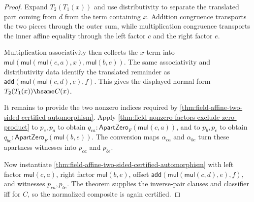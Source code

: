 \begin{proof}
Expand $T_2(T_1(x))$ and use distributivity to separate the translated part
coming from $d$ from the term containing $x$. Addition congruence transports
the two pieces through the outer sum, while multiplication congruence transports
the inner affine equality through the left factor $c$ and the right factor
$e$.

Multiplication associativity then collects the $x$-term into
$\mathsf{mul}(\mathsf{mul}(\mathsf{mul}(c,a),x),\mathsf{mul}(b,e))$. The same
associativity and distributivity data identify the translated remainder as
$\mathsf{add}(\mathsf{mul}(\mathsf{mul}(c,d),e),f)$. This gives the displayed
normal form $T_2(T_1(x))\hsame C(x)$.

It remains to provide the two nonzero indices required by
\autoref{thm:field-affine-two-sided-certified-automorphism}. Apply
\autoref{thm:field-nonzero-factors-exclude-zero-product} to $p_c,p_a$ to obtain
$q_{ca}:\mathsf{ApartZero}_F(\mathsf{mul}(c,a))$, and to $p_b,p_e$ to obtain
$q_{be}:\mathsf{ApartZero}_F(\mathsf{mul}(b,e))$. The conversion maps
$\alpha_{ca}$ and $\alpha_{be}$ turn these apartness witnesses into
$p_{ca}$ and $p_{be}$.

Now instantiate
\autoref{thm:field-affine-two-sided-certified-automorphism} with left factor
$\mathsf{mul}(c,a)$, right factor $\mathsf{mul}(b,e)$, offset
$\mathsf{add}(\mathsf{mul}(\mathsf{mul}(c,d),e),f)$, and witnesses
$p_{ca},p_{be}$. The theorem supplies the inverse-pair clauses and classifier
iff for $C$, so the normalized composite is again certified.
\end{proof}

